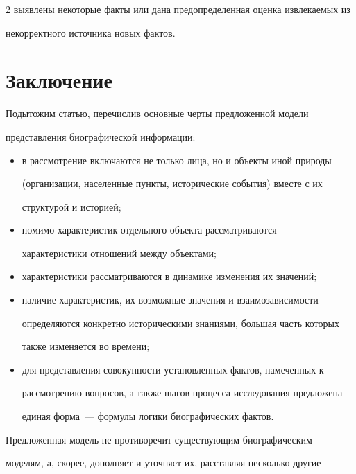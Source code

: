 \begin{multicols}{2}
выявлены некоторые факты или дана предопределенная оценка извлекаемых из 


некорректного источника новых фактов.





\section{Заключение}


  


  Подытожим статью, перечислив основные черты предложенной модели 


представления биографической информации:


  \begin{itemize}


\item в рассмотрение включаются не только лица, но и объекты иной природы 


(организации, населенные пункты, исторические события) вместе с их 


структурой и историей;


\item помимо характеристик отдельного объекта рассматриваются 


характеристики отношений между объектами;


\item характеристики рассматриваются в динамике изменения их значений;


\item наличие характеристик, их возможные значения и взаимозависимости 


определяются конкретно историческими знаниями, большая часть которых 


также изменяется во времени;


\item для представления совокупности установленных фактов, намеченных к 


рассмотрению вопросов, а также шагов процесса исследования предложена 


единая форма~--- формулы логики биографических фактов. 


\end{itemize}


  


  Предложенная модель не противоречит существующим биографическим 


моделям, а, скорее, дополняет и уточняет их, расставляя несколько другие 



\end{multicols}
